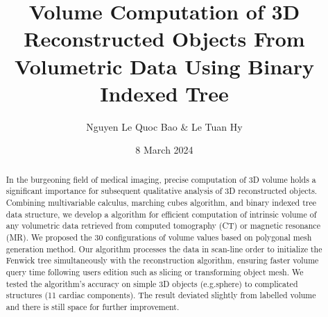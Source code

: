 \documentclass[11pt]{article}
\title{Volume Computation of 3D Reconstructed Objects From Volumetric Data Using Binary Indexed Tree}
\author{Nguyen Le Quoc Bao \& Le Tuan Hy}
\date{8 March 2024}
\begin{document}
\maketitle

\begin{center}
\begin{minipage}{0.8\textwidth}
\setlength{\leftskip}{3.5cm} 
\setlength{\rightskip}{3.5cm}
\begin{abstract}
    In the burgeoning field of medical imaging, precise computation of 3D volume holds a significant importance for subsequent qualitative analysis of 3D reconstructed objects. Combining multivariable calculus, marching cubes algorithm, and binary indexed tree data structure, we develop a algorithm for efficient computation of intrinsic volume of any volumetric data retrieved from computed tomography (CT) or magnetic resonance (MR). We proposed the 30 configurations of volume values based on polygonal mesh generation method. Our algorithm processes the data in scan-line order to initialize the Fenwick tree simultaneously with the reconstruction algorithm, ensuring faster volume query time following users edition such as slicing or transforming object mesh. We tested the algorithm's accuracy on simple 3D objects (e.g.sphere) to complicated structures (11 cardiac components). The result deviated slightly from labelled volume and there is still space for further improvement.
\end{abstract}
\end{minipage}
\end{center}
\end{document}
